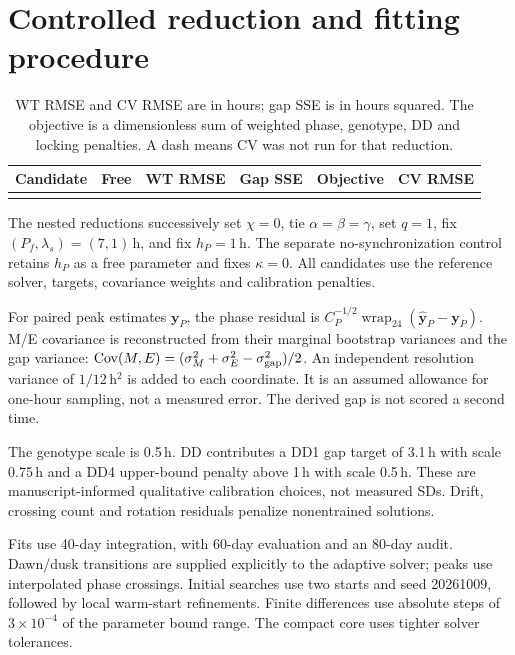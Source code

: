 \documentclass[11pt,letterpaper]{article}
\newcommand{\wrap}{\operatorname{wrap}_{24}}
\begin{document}
\clearpage
\section{Controlled reduction and fitting procedure}
\label{sec:fit}

\begin{table}[!htbp]
\centering\small
\setlength{\tabcolsep}{5pt}
\begin{tabularx}{\textwidth}{Yrrrrr}
\toprule
Candidate & Free & WT RMSE & Gap SSE & Objective & CV RMSE\\
\midrule
\\
\bottomrule
\end{tabularx}
\caption{WT RMSE and CV RMSE are in hours; gap SSE is in hours squared.
The objective is a dimensionless sum of weighted phase, genotype, DD
and locking penalties. A dash means CV was not run for that reduction.}
\label{tab:comparison}
\end{table}

The nested reductions successively set $\chi=0$, tie
$\alpha=\beta=\gamma$, set $q=1$, fix $(P_f,\lambda_s)=(7,1)$\,h,
and fix $h_P=1$\,h. The separate no-synchronization control retains
$h_P$ as a free parameter and fixes $\kappa=0$.
All candidates use the reference solver, targets, covariance weights and
calibration penalties.

For paired peak estimates $\mathbf y_P$, the phase residual is
$C_P^{-1/2}\wrap(\hat{\mathbf y}_P-\mathbf y_P)$.
M/E covariance is reconstructed from their marginal bootstrap variances
and the gap variance:
$\operatorname{Cov}(M,E)=(\sigma_M^2+\sigma_E^2-\sigma_{\rm gap}^2)/2$.
An independent resolution variance of $1/12$\,h$^2$ is added to each
coordinate. It is an assumed allowance for one-hour sampling, not a
measured error. The derived gap is not scored a second time.

The genotype scale is 0.5\,h. DD contributes a DD1 gap target of
3.1\,h with scale 0.75\,h and a DD4 upper-bound penalty above 1\,h
with scale 0.5\,h. These are manuscript-informed qualitative calibration
choices, not measured SDs. Drift, crossing count and rotation residuals
penalize nonentrained solutions.

Fits use 40-day integration, with 60-day evaluation and an 80-day
audit. Dawn/dusk transitions are supplied explicitly to the adaptive
solver; peaks use interpolated phase crossings. Initial searches use
two starts and seed 20261009, followed by local warm-start refinements.
Finite differences use absolute steps of $3\times10^{-4}$ of the
parameter bound range. The compact core uses tighter solver tolerances.
\end{document}
